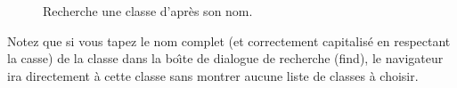 \documentclass[a4paper,10pt,twoside]{book}
\begin{document}
\begin{figure}[hbt]
\centerline{
}
\caption{Recherche une classe d'apr\`es son nom.\label{fig:findit}}
\end{figure}

Notez que si vous tapez le nom complet (et correctement capitalis\'e 
\cad en respectant la casse)
de la classe dans la bo\^{\i}te de dialogue de recherche (find), le
navigateur ira directement \`a cette classe sans montrer aucune liste
de classes \`a choisir.
\end{document}
